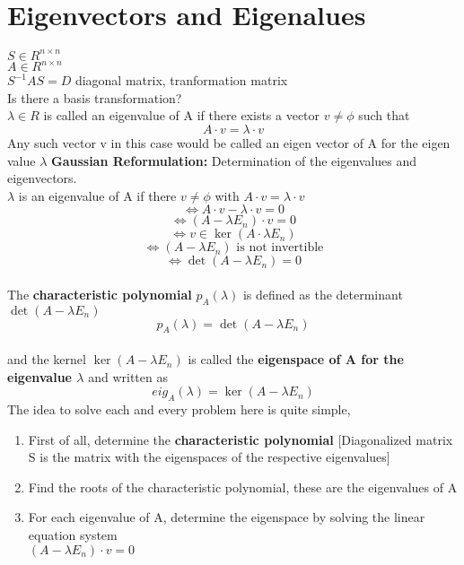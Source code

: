 \documentclass{article}
\begin{document}
\section{Eigenvectors and Eigenalues}
$S \in R^{n\times n}$ \\
$A \in R^{n \times n}$ \\
$S^{-1}AS = D$ diagonal matrix, tranformation matrix \\
Is there a basis transformation? \\ 
$\lambda \in R$ is called an eigenvalue of A if there exists a vector $v \neq \phi$ such that \begin{equation*} A \cdot v = \lambda \cdot v \end{equation*}
Any such vector v in this case would be called an eigen vector of A for the eigen value $\lambda$
\textbf{Gaussian Reformulation:} Determination of the eigenvalues and eigenvectors. \\
$\lambda$ is an eigenvalue of A if there $v\neq\phi$ with $A\cdot v = \lambda \cdot v$
\begin{equation*}
    \Leftrightarrow A\cdot v - \lambda \cdot v = 0 \end{equation*}
\begin{equation*}\Leftrightarrow (A-\lambda E_n) \cdot v = 0 \end{equation*}
\begin{equation*} \Leftrightarrow v \in \ker(A\cdot\lambda E_n) \end{equation*}
\begin{equation*}\Leftrightarrow (A-\lambda E_n) \text{  is not invertible} \end{equation*}
\begin{equation*} \Leftrightarrow \det(A-\lambda E_n) = 0 
\end{equation*} \\[2pt]
The \textbf{characteristic polynomial} $p_A(\lambda)$ is defined as the determinant $\det(A-\lambda E_n)$ \begin{equation*} p_A(\lambda) = \det(A-\lambda E_n) \end{equation*} \\ and the kernel $\ker(A-\lambda E_n)$ is called the \textbf{eigenspace of A for the eigenvalue $\lambda$} and written as \begin{equation*} eig_A(\lambda) = \ker(A-\lambda E_n) \end{equation*}
The idea to solve each and every problem here is quite simple,
\begin{enumerate}
    \item First of all, determine the \textbf{characteristic polynomial} [Diagonalized matrix S is the matrix with the eigenspaces of the respective eigenvalues]
    \item Find the roots of the characteristic polynomial, these are the eigenvalues of A
    \item For each eigenvalue of A, determine the eigenspace by solving the linear equation system \\ $(A-\lambda E_n) \cdot v = 0$ 
\end{enumerate}
\end{document}
